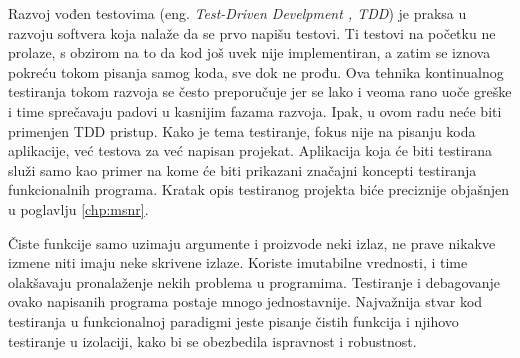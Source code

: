 \documentclass[12pt,oneside]{memoir}
\begin{document}
\par 
Razvoj vođen testovima (eng. \emph{Test-Driven Develpment , TDD}) je praksa u razvoju softvera koja nalaže da se prvo napišu testovi. Ti testovi na početku ne prolaze, s obzirom na to da kod još uvek nije implementiran, a zatim se iznova pokreću tokom pisanja samog koda, sve dok ne prođu. Ova tehnika kontinualnog testiranja tokom razvoja se često preporučuje  jer se lako i veoma rano uoče greške i time sprečavaju padovi u kasnijim fazama razvoja. Ipak, u ovom radu neće biti primenjen TDD pristup. Kako je tema testiranje, fokus nije na pisanju koda aplikacije, već testova za već napisan projekat. Aplikacija koja će biti testirana služi samo kao primer na kome će biti prikazani značajni koncepti testiranja funkcionalnih programa. Kratak opis testiranog projekta biće preciznije objašnjen u poglavlju \ref{chp:msnr}. 

\par Čiste funkcije samo uzimaju argumente i proizvode neki izlaz,  ne prave nikakve izmene niti imaju neke skrivene izlaze. Koriste imutabilne vrednosti, i time olakšavaju pronalaženje nekih problema u programima. Testiranje i debagovanje ovako napisanih programa  postaje mnogo jednostavnije. Najvažnija stvar kod testiranja u funkcionalnoj paradigmi jeste pisanje čistih funkcija i njihovo testiranje u izolaciji, kako bi se obezbedila ispravnost i robustnost. 
\end{document}
